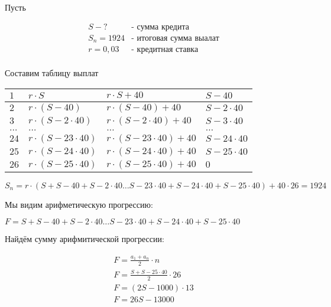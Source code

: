 \begin{tcolorbox}[
    colback=white!100!white,
    colframe=green!75!black,
    title=Решение 1.1
  ]


  Пусть

  \begin{equation*}
    \begin{array}{ll}
      S - ?      & \text{- сумма кредита}         \\
      S_n = 1924 & \text{- итоговая сумма выалат} \\
      r = 0,03   & \text{- кредитная ставка}      \\
    \end{array}
  \end{equation*}

  Составим таблицу выплат

  \begin{tabular}{|l|l|l|l|}
    \hline
    $1$     & $r\cdot S$                & $r\cdot S + 40$                & $S - 40$        \\ \hline
    $2$     & $r\cdot (S - 40)$         & $r\cdot (S - 40) + 40$         & $S - 2\cdot40$  \\ \hline
    $3$     & $r\cdot (S - 2\cdot 40)$  & $r\cdot (S - 2\cdot 40) + 40$  & $S - 3\cdot40$  \\ \hline
    $\dots$ & $\dots$                   & $\dots$                        & $\dots$         \\ \hline
    $24$    & $r\cdot (S - 23\cdot 40)$ & $r\cdot (S - 23\cdot 40) + 40$ & $S - 24\cdot40$ \\ \hline
    $25$    & $r\cdot (S - 24\cdot 40)$ & $r\cdot (S - 24\cdot 40) + 40$ & $S - 25\cdot40$ \\ \hline
    $26$    & $r\cdot (S - 25\cdot 40)$ & $r\cdot (S - 25\cdot 40) + 40$ & $0$             \\ \hline
  \end{tabular}

  $S_n = r\cdot(S + S - 40 + S - 2\cdot 40 \dots S - 23\cdot 40 + S - 24\cdot 40 + S - 25\cdot 40) + 40\cdot 26 = 1924$

  Мы видим арифметическую прогрессию:

  $F = S + S - 40 + S - 2\cdot 40 \dots S - 23\cdot 40 + S - 24\cdot 40 + S - 25\cdot 40$

  Найдём сумму арифмитической прогрессии:

  \begin{equation*}
    \begin{array}{l}
      F=\frac{a_1+a_n}{2}\cdot n             \\
      F=\frac{S + S - 25\cdot 40}{2}\cdot 26 \\
      F=(2S - 1000)\cdot 13                  \\
      F= 26S - 13000                         \\
    \end{array}
  \end{equation*}


\end{tcolorbox}
